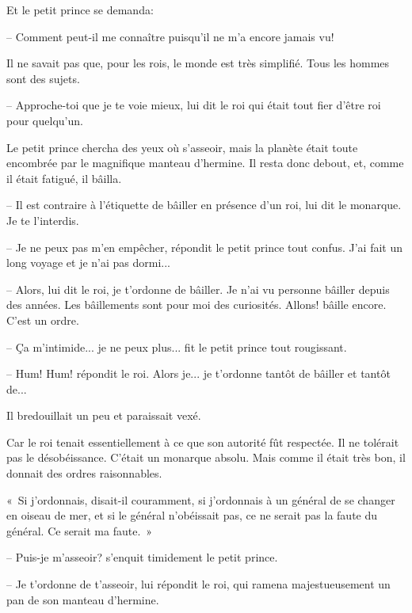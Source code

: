 \documentclass[a4paper]{report}
\begin{document}
Et le petit prince se demanda:

-- Comment peut-il me connaître puisqu'il ne m'a encore jamais vu!

Il ne savait pas que, pour les rois, le monde est très simplifié. Tous les hommes sont des sujets.

-- Approche-toi que je te voie mieux, lui dit le roi qui était tout fier d'être roi pour quelqu'un.


Le petit prince chercha des yeux où s'asseoir, mais la planète était toute encombrée par le magnifique manteau d'hermine. Il resta donc debout, et, comme il était fatigué, il bâilla.

-- Il est contraire à l'étiquette de bâiller en présence d'un roi, lui dit le monarque. Je te l'interdis.

-- Je ne peux pas m'en empêcher, répondit le petit prince tout confus. J'ai fait un long voyage et je n'ai pas dormi...

-- Alors, lui dit le roi, je t'ordonne de bâiller. Je n'ai vu personne bâiller depuis des années. Les bâillements sont pour moi des curiosités. Allons! bâille encore. C'est un ordre.

-- Ça m'intimide... je ne peux plus... fit le petit prince tout rougissant.

-- Hum! Hum! répondit le roi. Alors je... je t'ordonne tantôt de bâiller et tantôt de...

Il bredouillait un peu et paraissait vexé.

Car le roi tenait essentiellement à ce que son autorité fût respectée. Il ne tolérait pas le désobéissance. C'était un monarque absolu. Mais comme il était très bon, il donnait des ordres raisonnables.

«~Si j'ordonnais, disait-il couramment, si j'ordonnais à un général de se changer en oiseau de mer, et si le général n'obéissait pas, ce ne serait pas la faute du général. Ce serait ma faute.~»

-- Puis-je m'asseoir? s'enquit timidement le petit prince.

-- Je t'ordonne de t'asseoir, lui répondit le roi, qui ramena majestueusement un pan de son manteau d'hermine.
\end{document}
